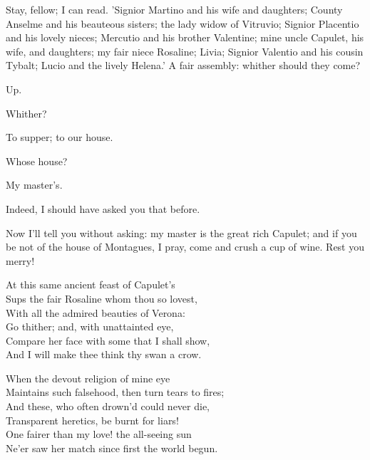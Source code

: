 \begin{speech}
Stay, fellow; I can read. 'Signior Martino and his wife and daughters;
County Anselme and his beauteous sisters;
the lady widow of Vitruvio; Signior
Placentio and his lovely nieces; Mercutio and
his brother Valentine; mine uncle Capulet,
his wife, and daughters; my fair niece Rosaline;
Livia; Signior Valentio and his cousin
Tybalt; Lucio and the lively Helena.'
A fair assembly: whither should they come?
\end{speech}
\begin{speech}
Up.
\end{speech}
\begin{speech}
Whither?
\end{speech}
\begin{speech}
To supper; to our house.
\end{speech}
\begin{speech}
Whose house?
\end{speech}
\begin{speech}
My master's.
\end{speech}
\begin{speech}
Indeed, I should have asked you
that before.
\end{speech}
\begin{speech}
Now I'll tell you without asking:
my master is the great rich Capulet; and if
you be not of the house of Montagues, I pray,
come and crush a cup of wine.   Rest you
merry! 
\end{speech}
\begin{speech}
At this same ancient feast of Capulet's \\
Sups the fair Rosaline whom thou so lovest, \\
With all the admired beauties of Verona: \\
Go thither; and, with unattainted eye, \\
Compare her face with some that I shall show, \\
And I will make thee think thy swan a crow. \\
\end{speech}
\begin{speech}
When the devout religion of mine eye \\
Maintains such falsehood, then turn tears to fires; \\
And these, who often drown'd could never die, \\
Transparent heretics, be burnt for liars! \\
One fairer than my love! the all-seeing sun \\
Ne'er saw her match since first the world begun. \\
\end{speech}
